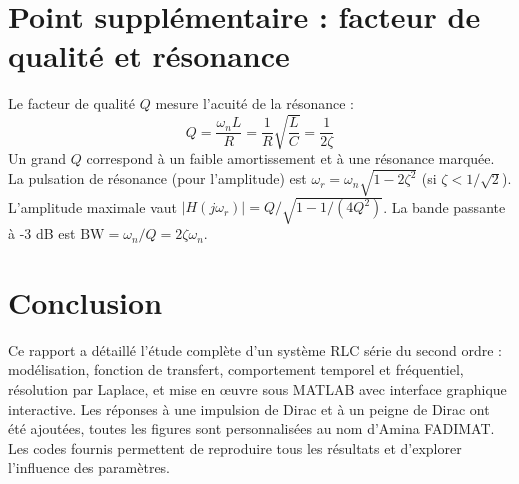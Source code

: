 \documentclass[12pt,a4paper]{article}
\begin{document}
	\section{Point supplémentaire : facteur de qualité et résonance}
	Le facteur de qualité $Q$ mesure l'acuité de la résonance :
	\begin{equation}
	Q = \frac{\omega_n L}{R} = \frac{1}{R}\sqrt{\frac{L}{C}} = \frac{1}{2\zeta}
	\end{equation}
	Un grand $Q$ correspond à un faible amortissement et à une résonance marquée. La pulsation de résonance (pour l'amplitude) est $\omega_r = \omega_n\sqrt{1-2\zeta^2}$ (si $\zeta<1/\sqrt{2}$). L'amplitude maximale vaut $|H(j\omega_r)| = Q/\sqrt{1-1/(4Q^2)}$. La bande passante à -3 dB est $\text{BW} = \omega_n/Q = 2\zeta\omega_n$.
	
	\section{Conclusion}
	Ce rapport a détaillé l'étude complète d'un système RLC série du second ordre : modélisation, fonction de transfert, comportement temporel et fréquentiel, résolution par Laplace, et mise en œuvre sous MATLAB avec interface graphique interactive. Les réponses à une impulsion de Dirac et à un peigne de Dirac ont été ajoutées, toutes les figures sont personnalisées au nom d'Amina FADIMAT. Les codes fournis permettent de reproduire tous les résultats et d'explorer l'influence des paramètres.
	
\end{document}
